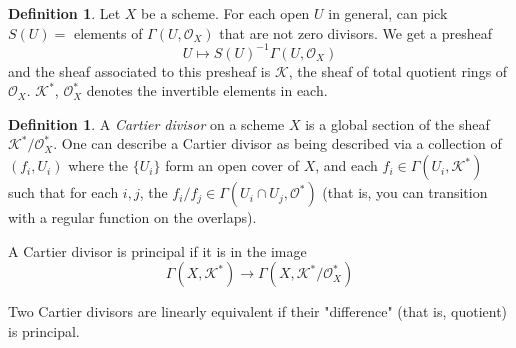 \documentclass[10pt,reqno]{amsart}
\theoremstyle{definition}
\newtheorem{definition}[theorem]{Definition}
\theoremstyle{remark}
\numberwithin{equation}{section}
\numberwithin{theorem}{section}
\newcommand{\OO}{{\mathcal O}}
\newcommand{\K}{{\mathscr K}}
\newcommand{\KK}{{\mathscr K}}
\begin{document}
\begin{definition} Let $X$ be a scheme. For each open $U$ in general, can pick $S(U) =$ elements of $\Gamma(U,\OO_X)$ that are not zero divisors. We get a presheaf
\[U \mapsto S(U)^{-1}\Gamma(U, \OO_X)\]
and the sheaf associated to this presheaf is $\K$, the sheaf of total quotient rings of $\OO_X$. $\KK^*$, $\OO_X^*$ denotes the invertible elements in each.
\end{definition}

\begin{definition}
A \textit{Cartier divisor} on a scheme $X$ is a global section of the sheaf $\K^*/\OO_X^*$. One can describe a Cartier divisor as being described via a collection of $(f_i, U_i)$ where the $\{U_i\}$ form an open cover of $X$, and each $f_i \in \Gamma(U_i, \K^*)$ such that for each $i,j$, the $f_i/f_j \in \Gamma(U_i \cap U_j, \OO^*)$ (that is, you can transition with a regular function on the overlaps).

A Cartier divisor is principal if it is in the image 
\[\Gamma(X,\K^*) \to \Gamma(X,\K^*/\OO_X^*)\]

Two Cartier divisors are linearly equivalent if their "difference" (that is, quotient) is principal.
\end{definition}
\end{document}

